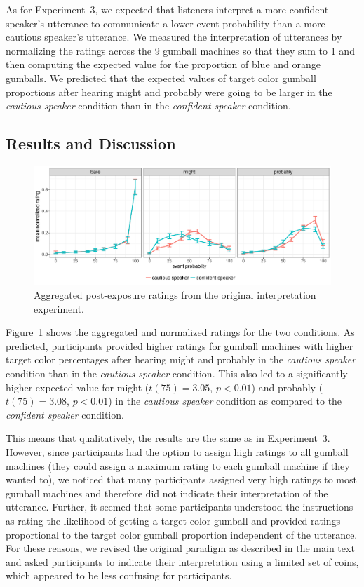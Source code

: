 As for Experiment~3, we expected that listeners interpret a more confident speaker's utterance 
to communicate a lower event probability than a more cautious speaker's utterance. We measured
the interpretation of utterances by normalizing the ratings across the 9 gumball machines so that they sum to
1 and then computing the expected value for the proportion of blue and orange gumballs. 
We predicted that the expected values of target color gumball proportions after hearing {\sc might} and {\sc probably} 
were going to be larger in the \emph{cautious speaker} condition than in the \emph{confident speaker} condition.

\subsection{Results and Discussion}

\begin{figure}[h!]
\includegraphics[width=\textwidth]{plots/fig-G1-exp-2-ratings-orig.pdf}
\caption{Aggregated post-exposure ratings from the original interpretation experiment.  \label{fig:adaptation-results-comp-orig}}
\end{figure}

Figure~\ref{fig:adaptation-results-comp-orig} shows the aggregated and normalized ratings for the two conditions.  As predicted, participants provided higher ratings for gumball machines with higher target color percentages after hearing {\sc might} and {\sc probably} in the \emph{cautious speaker} condition than in the \emph{cautious speaker} condition. This also led to a significantly higher expected value for {\sc might} ($t(75)=3.05$, $p<0.01$) and {\sc probably} ($t(75)=3.08$, $p<0.01$) in the \emph{cautious speaker} condition as compared to the \emph{confident speaker} condition.

This means that qualitatively, the results are the same as in Experiment~3. However, since participants had the option to assign high 
ratings to 
all gumball machines (they could assign a maximum rating to each gumball machine if they wanted to), we noticed that many participants assigned very high ratings to most gumball 
machines and therefore did not indicate their interpretation of the utterance. Further, it seemed that some participants
understood the instructions as rating the likelihood of getting a target color gumball and provided ratings proportional to the 
target color gumball proportion independent of the utterance. For these reasons, we revised the original paradigm as described
in the main text and asked participants to indicate their interpretation using a limited set of coins, which appeared to be less
confusing for participants. 
